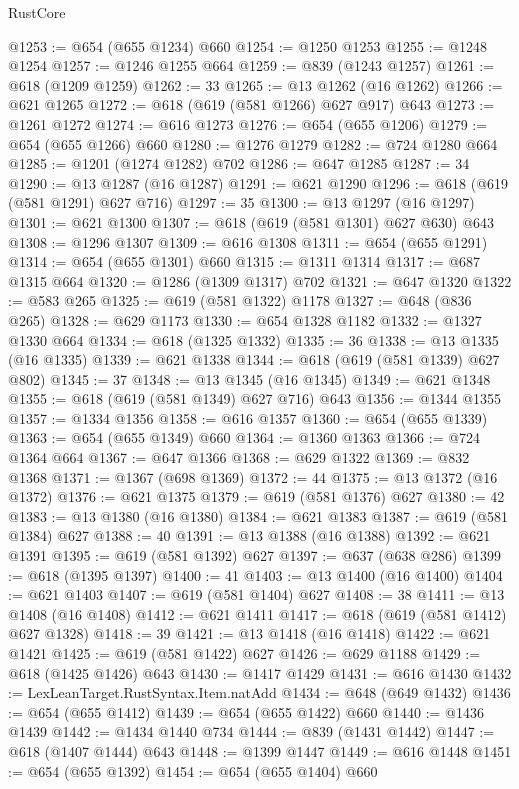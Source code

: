 \begin{lexlean}{RustCore}
\begin{coremodule}
@1253 := @654 (@655 @1234) @660
@1254 := @1250 @1253
@1255 := @1248 @1254
@1257 := @1246 @1255 @664
@1259 := @839 (@1243 @1257)
@1261 := @618 (@1209 @1259)
@1262 := 33
@1265 := @13 @1262 (@16 @1262)
@1266 := @621 @1265
@1272 := @618 (@619 (@581 @1266) @627 @917) @643
@1273 := @1261 @1272
@1274 := @616 @1273
@1276 := @654 (@655 @1206)
@1279 := @654 (@655 @1266) @660
@1280 := @1276 @1279
@1282 := @724 @1280 @664
@1285 := @1201 (@1274 @1282) @702
@1286 := @647 @1285
@1287 := 34
@1290 := @13 @1287 (@16 @1287)
@1291 := @621 @1290
@1296 := @618 (@619 (@581 @1291) @627 @716)
@1297 := 35
@1300 := @13 @1297 (@16 @1297)
@1301 := @621 @1300
@1307 := @618 (@619 (@581 @1301) @627 @630) @643
@1308 := @1296 @1307
@1309 := @616 @1308
@1311 := @654 (@655 @1291)
@1314 := @654 (@655 @1301) @660
@1315 := @1311 @1314
@1317 := @687 @1315 @664
@1320 := @1286 (@1309 @1317) @702
@1321 := @647 @1320
@1322 := @583 @265
@1325 := @619 (@581 @1322) @1178
@1327 := @648 (@836 @265)
@1328 := @629 @1173
@1330 := @654 @1328 @1182
@1332 := @1327 @1330 @664
@1334 := @618 (@1325 @1332)
@1335 := 36
@1338 := @13 @1335 (@16 @1335)
@1339 := @621 @1338
@1344 := @618 (@619 (@581 @1339) @627 @802)
@1345 := 37
@1348 := @13 @1345 (@16 @1345)
@1349 := @621 @1348
@1355 := @618 (@619 (@581 @1349) @627 @716) @643
@1356 := @1344 @1355
@1357 := @1334 @1356
@1358 := @616 @1357
@1360 := @654 (@655 @1339)
@1363 := @654 (@655 @1349) @660
@1364 := @1360 @1363
@1366 := @724 @1364 @664
@1367 := @647 @1366
@1368 := @629 @1322
@1369 := @832 @1368
@1371 := @1367 (@698 @1369)
@1372 := 44
@1375 := @13 @1372 (@16 @1372)
@1376 := @621 @1375
@1379 := @619 (@581 @1376) @627
@1380 := 42
@1383 := @13 @1380 (@16 @1380)
@1384 := @621 @1383
@1387 := @619 (@581 @1384) @627
@1388 := 40
@1391 := @13 @1388 (@16 @1388)
@1392 := @621 @1391
@1395 := @619 (@581 @1392) @627
@1397 := @637 (@638 @286)
@1399 := @618 (@1395 @1397)
@1400 := 41
@1403 := @13 @1400 (@16 @1400)
@1404 := @621 @1403
@1407 := @619 (@581 @1404) @627
@1408 := 38
@1411 := @13 @1408 (@16 @1408)
@1412 := @621 @1411
@1417 := @618 (@619 (@581 @1412) @627 @1328)
@1418 := 39
@1421 := @13 @1418 (@16 @1418)
@1422 := @621 @1421
@1425 := @619 (@581 @1422) @627
@1426 := @629 @1188
@1429 := @618 (@1425 @1426) @643
@1430 := @1417 @1429
@1431 := @616 @1430
@1432 := LexLeanTarget.RustSyntax.Item.natAdd
@1434 := @648 (@649 @1432)
@1436 := @654 (@655 @1412)
@1439 := @654 (@655 @1422) @660
@1440 := @1436 @1439
@1442 := @1434 @1440 @734
@1444 := @839 (@1431 @1442)
@1447 := @618 (@1407 @1444) @643
@1448 := @1399 @1447
@1449 := @616 @1448
@1451 := @654 (@655 @1392)
@1454 := @654 (@655 @1404) @660

\end{coremodule}
\end{lexlean}
